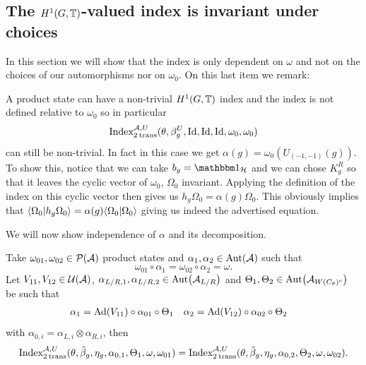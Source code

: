 \documentclass[12pt,a4paper,twoside]{article}
\numberwithin{equation}{section}
\begin{document}
\subsection{The $H^1(G,\TT)$-valued index is invariant under choices}
In this section we will show that the index is only dependent on $\omega$ and not on the choices of our automorphisms nor on $\omega_0$. On this last item we remark:
\begin{remark}\label{rem:NontrivialProductState}
	A product state can have a non-trivial $H^1(G,\TT)$ index and the index is not defined relative to $\omega_0$ so in particular
	\begin{equation}
		\textrm{Index}_{2\:\text{trans}}^{\AA,U}(\theta,\beta_g^U,\textrm{Id},\textrm{Id},\textrm{Id},\omega_0,\omega_0)
	\end{equation}
	can still be non-trivial. In fact in this case we get $\alpha(g)=\omega_0(U_{(-1,-1)}(g))$. To show this, notice that we can take $b_g=\id_{\HH}$ and we can chose $K_g^R$ so that it leaves the cyclic vector of $\omega_0$, $\Omega_0$ invariant. Applying the definition of the index on this cyclic vector then gives us $h_g\Omega_0=\alpha(g)\Omega_0$. This obviously implies that $\bra{\Omega_0}\ket{h_g\Omega_0}=\alpha(g)\bra{\Omega_0}\ket{\Omega_0}$ giving us indeed the advertised equation.
\end{remark}
We will now show independence of $\alpha$ and its decomposition.
\begin{lemma}
	Take $\omega_{01},\omega_{02}\in\PP(\AA)$ product states and $\alpha_1,\alpha_2\in\Aut{\AA}$ such that
	\begin{equation}
		\omega_{01}\circ\alpha_1=\omega_{02}\circ\alpha_2=\omega.
	\end{equation}
	Let $V_{11},V_{12}\in\UU(\AA)$, $\alpha_{L/R,1},\alpha_{L/R,2}\in\Aut{\AA_{L/R}}$ and $\Theta_1,\Theta_2\in \Aut{\AA_{W(C_\theta)^c}}$ be such that
	\begin{align}
		\alpha_1&=\Ad{V_{11}}\circ\alpha_{01}\circ\Theta_1&\alpha_2&=\Ad{V_{12}}\circ\alpha_{02}\circ \Theta_2
	\end{align}
	with $\alpha_{0,i}=\alpha_{L,i}\otimes\alpha_{R,i}$, then
	\begin{equation}
		\textrm{Index}_{2\:\text{trans}}^{\AA,U}(\theta,\tilde{\beta}_g,\eta_g,\alpha_{0,1},\Theta_1,\omega,\omega_{01})=\textrm{Index}_{2\:\text{trans}}^{\AA,U}(\theta,\tilde{\beta}_g,\eta_g,\alpha_{0,2},\Theta_2,\omega,\omega_{02}).
	\end{equation}
\end{lemma}
\end{document}
